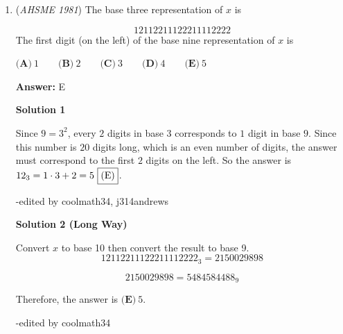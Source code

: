 \begin{enumerate}
 \[\log_{b} 2 \cdot \log_{b} 2x = \log_{b} 3 \cdot \log_{b} 3x\]

 \[\log_{b} 2 \cdot (\log_{b} 2 + \log_{b} x) = \log_{b} 3 \cdot (\log_{b} 3 + \log_{b} x)\]

 \[(\log_{b} 2)^2  + \log_{b} 2 \cdot \log_{b} x = (\log_{b} 3)^2 + \log_{b} 3 \cdot \log_{b} x\]

 \[(\log_{b} 2)^2 - (\log_{b} 3)^2  =  \log_{b} 3 \cdot \log_{b} x - \log_{b} 2 \cdot \log_{b} x\]

 \[(\log_{b} 2 + \log_{b} 3)(\log_{b} 2 - \log_{b} 3) = \log_{b} x \cdot (\log_{b} 3 - \log_{b} 2)\]

 \[\log_{b} 2 + \log_{b} 3 = -\log_{b} x\]

 \[\log_{b} 6 = -\log_{b} x\]

 \[6 = \frac{1}{x}\]

 \[x = \boxed {(\textbf{B})\ \frac{1}{6}}\]

 -j314andrews

 


	\item (\textit{AHSME 1981}) The base three representation of $x$ is 

 \[12112211122211112222\]
The first digit (on the left) of the base nine representation of $x$ is


 $\textbf{(A)}\ 1\qquad\textbf{(B)}\ 2\qquad\textbf{(C)}\ 3\qquad\textbf{(D)}\ 4\qquad\textbf{(E)}\ 5$

 \textbf{Answer: }E



\textbf{Solution 1}

Since $9=3^2$, every $2$ digits in base $3$ corresponds to $1$ digit in base $9$. Since this number is $20$ digits long, which is an even number of digits, the answer must correspond to the first $2$ digits on the left. So the answer is $12_{3} = 1 \cdot 3 + 2 = 5\ \fbox{(E)}$.

 -edited by coolmath34, j314andrews

 



\textbf{Solution 2 (Long Way)}

Convert $x$ to base 10 then convert the result to base 9.
 \[12112211122211112222_{3} = 2150029898\]

 \[2150029898 = 5484584488_{9}\]

 Therefore, the answer is $\textbf{(E)}\ 5.$

 -edited by coolmath34

 



\end{enumerate}
